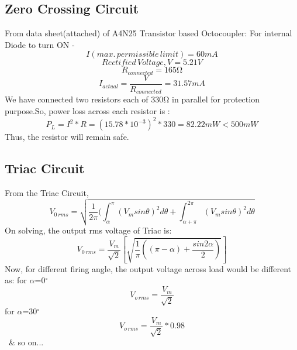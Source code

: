              \subsection{Zero Crossing Circuit}
             From data sheet(attached) of A4N25 Transistor based Octocoupler:
             For internal Diode to turn ON -
             \begin{equation}
             I(max.\,permissible\,limit)=60mA
             \end{equation}
             \begin{equation}
            Rectified\,Voltage,V=5.21V
             \end{equation}
             \begin{equation}
            R_{connected}=165{\si\ohm}
             \end{equation}
             \begin{equation}
             I_{actual}=\frac{V}{R_{connected}}=31.57mA
             \end{equation}
             We have connected two resistors each of 330{\si\ohm} in parallel for protection purpose.So, power loss across each resistor is :
             \begin{equation}
            P_L=I^2*R={(15.78*10^{-3})}^2*330=82.22mW<500mW
             \end{equation}
             Thus, the resistor will remain safe. 
             \subsection{Triac Circuit}
             From the Triac Circuit,
             \begin{equation}
            V_{0\,rms}=\sqrt{\frac{1}{2{\pi}}(\int^{\pi}_{\alpha}{{(V_msin\theta)}^2}d\theta+\int^{2\pi}_{\alpha+\pi}{{(V_msin\theta)}^2}d\theta}
             \end{equation}
            On solving, the output rms voltage of Triac is:
            \begin{equation}
            V_{0\,rms}=\frac{V_m}{\sqrt{2}}[\sqrt{\frac{1}{\pi}((\pi-\alpha)+\frac{sin2\alpha}{2})}]
             \end{equation}
             Now, for different firing angle, the output voltage across load would be different as:
             for $\alpha$=0$^\circ$
             \begin{equation}
             V_{o\,rms}=\frac{V_m}{\sqrt{2}}
             \end{equation}
             for $\alpha$=30$^\circ$
             \begin{equation}
            V_{o\,rms}=\frac{V_m}{\sqrt{2}}*0.98
             \end{equation}\
             \& so on...
